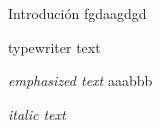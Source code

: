 \documentclass{beamer}
\begin{document}
\begin{frame}{Introduci\'on}
fgdaagdgd

\ttfamily typewriter text

{\em emphasized text} aaabbb

\itshape italic text
\end{frame}
\end{document}
